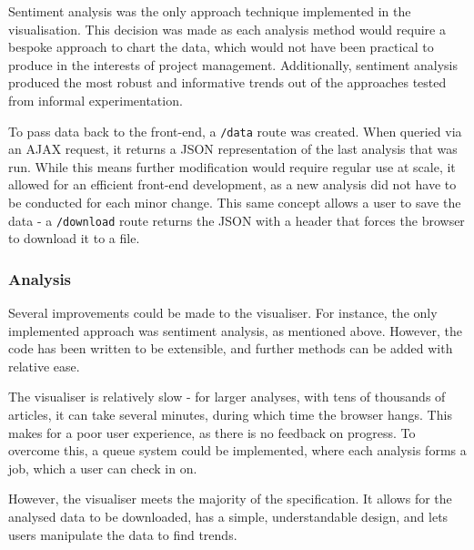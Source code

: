 Sentiment analysis was the only approach technique implemented in the visualisation. This decision was made as each analysis method would require a bespoke approach to chart the data, which would not have been practical to produce in the interests of project management. Additionally, sentiment analysis produced the most robust and informative trends out of the approaches tested from informal experimentation.

To pass data back to the front-end, a \texttt{/data} route was created. When queried via an AJAX request, it returns a JSON representation of the last analysis that was run. While this means further modification would require regular use at scale, it allowed for an efficient front-end development, as a new analysis did not have to be conducted for each minor change. This same concept allows a user to save the data - a \texttt{/download} route returns the JSON with a header that forces the browser to download it to a file.

\subsubsection{Analysis}
Several improvements could be made to the visualiser. For instance, the only implemented approach was sentiment analysis, as mentioned above. However, the code has been written to be extensible, and further methods can be added with relative ease.

The visualiser is relatively slow - for larger analyses, with tens of thousands of articles, it can take several minutes, during which time the browser hangs. This makes for a poor user experience, as there is no feedback on progress. To overcome this, a queue system could be implemented, where each analysis forms a job, which a user can check in on.

However, the visualiser meets the majority of the specification. It allows for the analysed data to be downloaded, has a simple, understandable design, and lets users manipulate the data to find trends.
